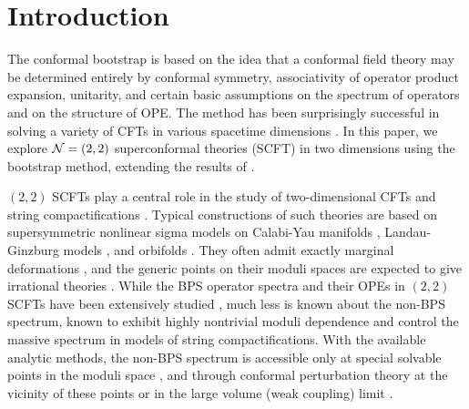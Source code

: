 \documentclass[12pt]{article}
\begin{document}
\eject

\tableofcontents

%

\section{Introduction} 

The conformal bootstrap is based on the idea that a conformal field theory may be determined entirely by conformal symmetry, associativity of operator product expansion, unitarity, and certain basic assumptions on the spectrum of operators and on the structure of OPE. The method has been surprisingly successful in solving a variety of CFTs in various spacetime dimensions \cite{Belavin:1984vu,Rattazzi:2008pe, Rychkov:2009ij, Poland:2010wg, Poland:2011ey, ElShowk:2012ht,Kos:2013tga, Beem:2013qxa, Beem:2014zpa, El-Showk:2014dwa,Chester:2014fya,Chester:2014mea,Chester:2014gqa,Bae:2014hia,Chester:2015qca,Iliesiu:2015qra,Kos:2015mba,Beem:2015aoa,Lemos:2015awa,Lin:2015wcg}. In this paper, we explore ${\cal N}=(2,2)$ superconformal theories (SCFT) in two dimensions using the bootstrap method, extending the results of \cite{Lin:2015wcg}.

$(2,2)$ SCFTs play a central role in the study of two-dimensional CFTs and string compactifications \cite{Candelas:1985en, Gepner:1987qi, Gepner:1987vz}. Typical constructions of such theories are based on supersymmetric nonlinear sigma models on Calabi-Yau manifolds \cite{Candelas:1985en,Eguchi:1988vra,Witten:1993yc}, Landau-Ginzburg models \cite{Vafa:1988uu,Lerche:1989uy,Cecotti:1989jc,Cecotti:1989gv,Martinec:1989in,Vafa:1990mu,Cecotti:1990kz}, and orbifolds \cite{Dixon:1986qv,Vafa:1989xc}. They often admit exactly marginal deformations \cite{Dixon:1987bg, Seiberg:1988pf,Kutasov:1988xb}, and the generic points on their moduli spaces are expected to give irrational theories \cite{Gukov:2002nw}. While the BPS operator spectra and their OPEs in $(2,2)$ SCFTs have been extensively studied \cite{Eguchi:1988af, Eguchi:1988vra, Lerche:1989uy,Cecotti:1989jc,Cecotti:1989gv,Cecotti:1990kz, Cecotti:1991me}, much less is known about the non-BPS spectrum, known to exhibit highly nontrivial moduli dependence \cite{Ooguri:1995wj,Seiberg:1999xz} and control the massive spectrum in models of string compactifications. With the available analytic methods, the non-BPS spectrum is accessible only at special solvable points in the moduli space \cite{Dixon:1986qv,Gepner:1987qi, Gepner:1987vz, Lunin:2000yv}, and through conformal perturbation theory \cite{Kutasov:1988xb} at the vicinity of these points or in the large volume (weak coupling) limit \cite{Douglas:aa}. 
\end{document}
